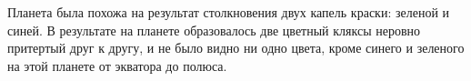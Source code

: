 Планета была похожа на результат столкновения двух капель краски: зеленой и синей. В результате на планете образовалось две цветный кляксы неровно притертый друг к другу, и не было видно ни одно цвета, кроме синего и зеленого на этой планете от экватора до полюса.